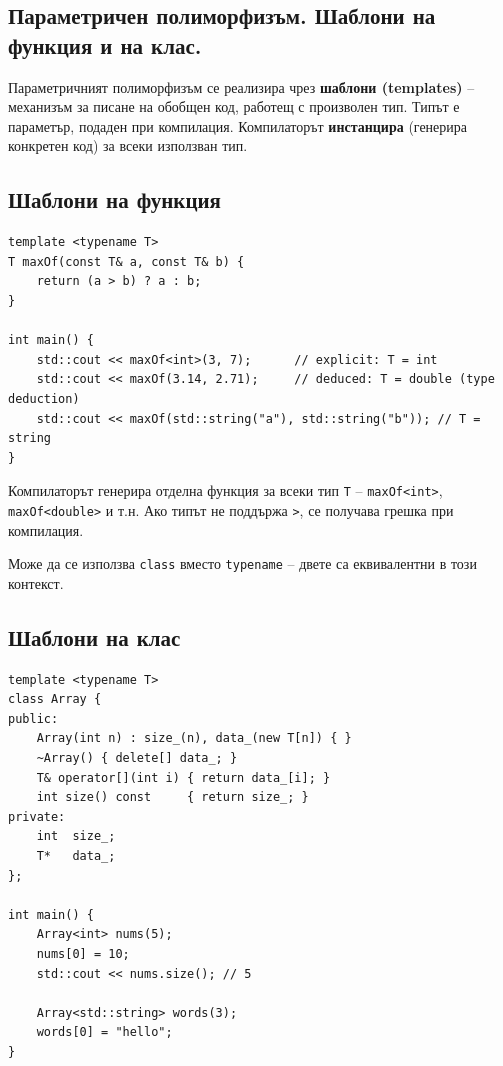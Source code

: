\documentclass{scrartcl}
\begin{document}
\begin{FlushLeft}
\section{Параметричен полиморфизъм. Шаблони на функция и на клас.}

Параметричният полиморфизъм се реализира чрез \textbf{шаблони (templates)} -- механизъм за писане на обобщен код, работещ с произволен тип. Типът е параметър, подаден при компилация. Компилаторът \textbf{инстанцира} (генерира конкретен код) за всеки използван тип.

\subsection{Шаблони на функция}

\begin{lstlisting}
template <typename T>
T maxOf(const T& a, const T& b) {
    return (a > b) ? a : b;
}

int main() {
    std::cout << maxOf<int>(3, 7);      // explicit: T = int
    std::cout << maxOf(3.14, 2.71);     // deduced: T = double (type deduction)
    std::cout << maxOf(std::string("a"), std::string("b")); // T = string
}
\end{lstlisting}

Компилаторът генерира отделна функция за всеки тип \texttt{T} -- \texttt{maxOf<int>}, \texttt{maxOf<double>} и т.н. Ако типът не поддържа \texttt{>}, се получава грешка при компилация.

Може да се използва \texttt{class} вместо \texttt{typename} -- двете са еквивалентни в този контекст.

\subsection{Шаблони на клас}

\begin{lstlisting}
template <typename T>
class Array {
public:
    Array(int n) : size_(n), data_(new T[n]) { }
    ~Array() { delete[] data_; }
    T& operator[](int i) { return data_[i]; }
    int size() const     { return size_; }
private:
    int  size_;
    T*   data_;
};

int main() {
    Array<int> nums(5);
    nums[0] = 10;
    std::cout << nums.size(); // 5

    Array<std::string> words(3);
    words[0] = "hello";
}
\end{lstlisting}


\end{FlushLeft}
\end{document}
